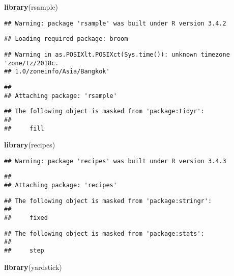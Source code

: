 \documentclass[]{article}
\newenvironment{Shaded}{\begin{snugshade}}{\end{snugshade}}
\newcommand{\KeywordTok}[1]{\textcolor[rgb]{0.13,0.29,0.53}{\textbf{#1}}}
\newcommand{\NormalTok}[1]{#1}
\begin{document}
\begin{Shaded}
\begin{Highlighting}[]
\KeywordTok{library}\NormalTok{(rsample)}
\end{Highlighting}
\end{Shaded}

\begin{verbatim}
## Warning: package 'rsample' was built under R version 3.4.2
\end{verbatim}

\begin{verbatim}
## Loading required package: broom
\end{verbatim}

\begin{verbatim}
## Warning in as.POSIXlt.POSIXct(Sys.time()): unknown timezone 'zone/tz/2018c.
## 1.0/zoneinfo/Asia/Bangkok'
\end{verbatim}

\begin{verbatim}
## 
## Attaching package: 'rsample'
\end{verbatim}

\begin{verbatim}
## The following object is masked from 'package:tidyr':
## 
##     fill
\end{verbatim}

\begin{Shaded}
\begin{Highlighting}[]
\KeywordTok{library}\NormalTok{(recipes)}
\end{Highlighting}
\end{Shaded}

\begin{verbatim}
## Warning: package 'recipes' was built under R version 3.4.3
\end{verbatim}

\begin{verbatim}
## 
## Attaching package: 'recipes'
\end{verbatim}

\begin{verbatim}
## The following object is masked from 'package:stringr':
## 
##     fixed
\end{verbatim}

\begin{verbatim}
## The following object is masked from 'package:stats':
## 
##     step
\end{verbatim}

\begin{Shaded}
\begin{Highlighting}[]
\KeywordTok{library}\NormalTok{(yardstick)}
\end{Highlighting}
\end{Shaded}
\end{document}
